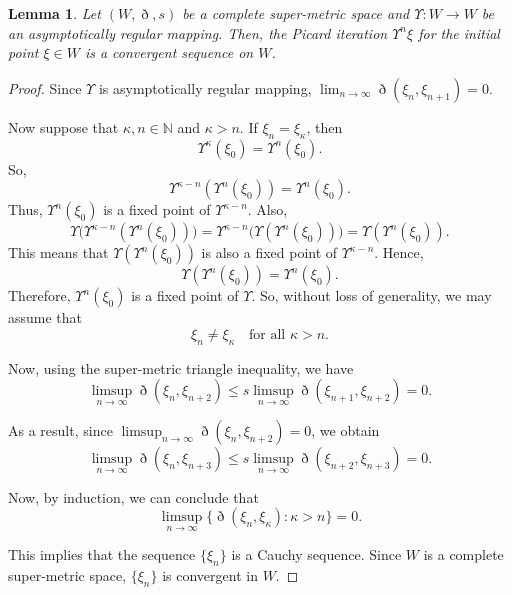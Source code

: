 \documentclass[pdflatex,sn-mathphys-num]{sn-jnl}%
\theoremstyle{thmstyleone}%
\newtheorem{lemma}[theorem]{Lemma}
\theoremstyle{thmstyletwo}%
\theoremstyle{thmstylethree}%
\begin{document}
\begin{lemma}\label{convergent lemma}
    Let $(W, \eth, s)$ be a complete super-metric space and $\Upsilon : W \to W$ be an asymptotically regular mapping. Then, the Picard iteration ${\Upsilon^n\xi} $ for the initial point $\xi \in W$ is a convergent sequence on $W$. 
\end{lemma}
\begin{proof}
    Since $\Upsilon $ is asymptotically regular mapping, $\lim_{n \to \infty}\eth(\xi_n,\xi_{n+1})=0$.

     Now suppose that $\kappa, n \in \mathbb{N}$ and $\kappa > n$. If $\xi_n = \xi_\kappa$, then
\[
\Upsilon^\kappa(\xi_0) = \Upsilon^n(\xi_0).
\]
So,
\[
\Upsilon^{\kappa-n}(\Upsilon^n(\xi_0)) = \Upsilon^n(\xi_0).
\]
Thus, $\Upsilon^n(\xi_0)$ is a fixed point of $\Upsilon^{\kappa-n}$. Also,
\[
\Upsilon  \big(\Upsilon^{\kappa-n}(\Upsilon^n(\xi_0))\big)
= \Upsilon^{\kappa-n}\big(\Upsilon(\Upsilon^n(\xi_0))\big)
= \Upsilon(\Upsilon^n(\xi_0)).
\]
This means that $\Upsilon(\Upsilon^n(\xi_0))$ is also a fixed point of $\Upsilon^{\kappa-n}$. Hence,
\[
\Upsilon(\Upsilon^n(\xi_0)) = \Upsilon^n(\xi_0).
\]
Therefore, $\Upsilon^n(\xi_0)$ is a fixed point of $\Upsilon $. So, without loss of generality, we may assume that
\[
\xi_n \neq \xi_\kappa \quad \text{for all } \kappa > n.
\]

Now, using the  super-metric triangle inequality, we have
\[
\limsup_{n \to \infty} \eth(\xi_n, \xi_{n+2})
\le s\limsup_{n \to \infty} \eth(\xi_{n+1}, \xi_{n+2}) = 0.
\]

As a result, since $\limsup_{n \to \infty} \eth(\xi_n, \xi_{n+2}) = 0$, we obtain
\[
\limsup_{n \to \infty} \eth(\xi_n, \xi_{n+3})
\le s\limsup_{n \to \infty} \eth(\xi_{n+2}, \xi_{n+3}) = 0.
\]

Now, by induction, we can conclude that
\[
\limsup_{n \to \infty} \{ \eth(\xi_n, \xi_\kappa) : \kappa > n \} = 0.
\]

This implies that the sequence $\{\xi_n\}$ is a Cauchy sequence.  
Since $W$ is a complete super-metric space, $\{\xi_n\}$ is convergent in $W$.
\end{proof}
\end{document}
